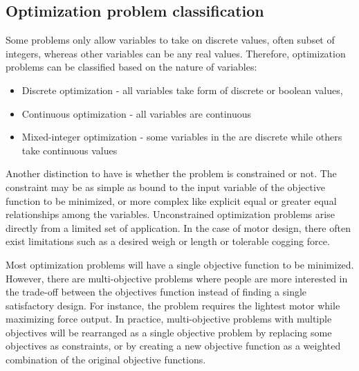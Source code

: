     
    \subsection{Optimization problem classification}    \label{Chapter:background/optimization methods/optimization prob classification}

        
        Some problems only allow variables to take on discrete values, often subset of integers, whereas other variables can be any real values. Therefore, optimization problems can be classified based on the nature of variables:

        \begin{itemize}
            \item Discrete optimization - all variables take form of discrete or boolean values,
            \item Continuous optimization - all variables are continuous
            \item Mixed-integer optimization - some variables in the are discrete while others take continuous values
        \end{itemize}
   
        Another distinction to have is whether the problem is constrained or not. The constraint may be as simple as bound to the input variable of the objective function to be minimized, or more complex like explicit equal or greater equal relationships among the variables. Unconstrained optimization problems arise directly from a limited set of application. In the case of motor design, there often exist limitations such as a desired weigh or length or tolerable cogging force.
        
        
        Most optimization problems will have a single objective function to be minimized. However, there are multi-objective problems where people are more interested in the trade-off between the objectives function instead of finding a single satisfactory design. For instance, the problem requires the lightest motor while maximizing force output. In practice, multi-objective problems with multiple objectives will be rearranged as a single objective problem by replacing some objectives as constraints, or by creating a new objective function as a weighted combination of the original objective functions.
        

